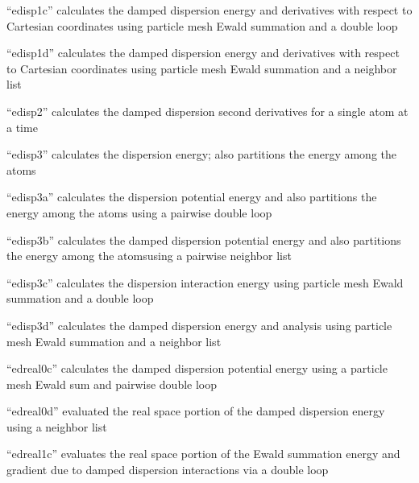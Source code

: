 \documentclass[letterpaper,11pt,english]{sphinxmanual}
\begin{document}
“edisp1c” calculates the damped dispersion energy and
derivatives with respect to Cartesian coordinates using
particle mesh Ewald summation and a double loop


“edisp1d” calculates the damped dispersion energy and
derivatives with respect to Cartesian coordinates using
particle mesh Ewald summation and a neighbor list


“edisp2” calculates the damped dispersion second derivatives
for a single atom at a time


“edisp3” calculates the dispersion energy; also partitions
the energy among the atoms


“edisp3a” calculates the dispersion potential energy and
also partitions the energy among the atoms using a pairwise
double loop


“edisp3b” calculates the damped dispersion potential energy
and also partitions the energy among the atomsusing a pairwise
neighbor list


“edisp3c” calculates the dispersion interaction energy using
particle mesh Ewald summation and a double loop


“edisp3d” calculates the damped dispersion energy and analysis
using particle mesh Ewald summation and a neighbor list


“edreal0c” calculates the damped dispersion potential energy
using a particle mesh Ewald sum and pairwise double loop


“edreal0d” evaluated the real space portion of the damped
dispersion energy using a neighbor list


“edreal1c” evaluates the real space portion of the Ewald
summation energy and gradient due to damped dispersion
interactions via a double loop

\end{document}
